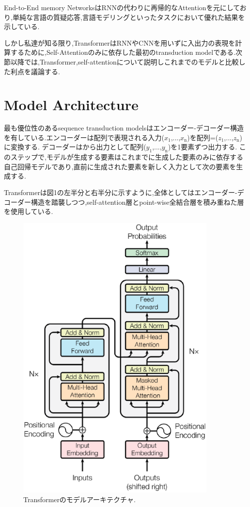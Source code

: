 \documentclass{jarticle}     %
\begin{document}
End-to-End memory NetworksはRNNの代わりに再帰的なAttentionを元にしており,単純な言語の質疑応答,言語モデリングといったタスクにおいて優れた結果を示している.\par

しかし私達が知る限り,TransformerはRNNやCNNを用いずに入出力の表現を計算するために,Self-Attentionのみに依存した最初のtransduction modelである.次節以降では,Transformer,self-attentionについて説明しこれまでのモデルと比較した利点を議論する.




\section{Model Architecture}
最も優位性のあるsequence transduction modelsはエンコーダー-デコーダー構造を有している.エンコーダーは配列で表現される入力($x_\mathrm{1}$,...,$x_\mathrm{n}$)を配列=($z_\mathrm{1}$,...,$z_\mathrm{n}$)に変換する.
デコーダーはから出力として配列($y_\mathrm{1}$,...,$y_\mathrm{n}$)を1要素ずつ出力する.
このステップで,モデルが生成する要素はこれまでに生成した要素のみに依存する自己回帰モデルであり,直前に生成された要素を新しく入力として次の要素を生成する.\par
Transformerは図1の左半分と右半分に示すように,全体としてはエンコーダー-デコーダー構造を踏襲しつつ,self-attention層とpoint-wise全結合層を積み重ねた層を使用している.

\begin{figure}[ht]
  \centering
  \includegraphics[width=100mm]{assets/Figure1.eps}
  \caption{Transformerのモデルアーキテクチャ.}
  \label{Figure1}
\end{figure}
\end{document}
